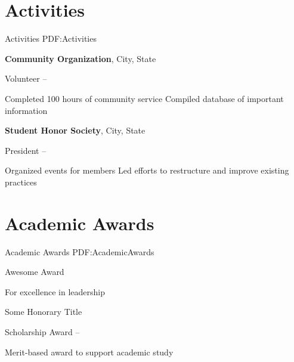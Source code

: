 \documentclass[letterpaper,9pt,oneside]{article}
\begin{document}
\begin{body}


\section
{Activities}
{Activities}
{PDF:Activities}

\textbf{Community Organization}, City, State
\par
Volunteer
\hfill
{} --
\begin{detail}
\SmallEntryGap
\BulletItem
Completed 100 hours of community service
\BulletItem
Compiled database of important information
\end{detail}

\EntryGap
\textbf{Student Honor Society}, City, State
\par
President
\hfill
{} --
\begin{detail}
\SmallEntryGap
\BulletItem
Organized events for members
\BulletItem
Led efforts to restructure and improve existing practices
\end{detail}



\section
{Academic Awards}
{Academic Awards}
{PDF:AcademicAwards}

Awesome Award
\hfill
{}
\begin{detail}
For excellence in leadership
\end{detail}

\EntryGap
Some Honorary Title
\hfill
{}

\EntryGap
Scholarship Award
\hfill 
{} --
\begin{detail}
Merit-based award to support academic study 
\end{detail}

\EntryGap




\end{body}
\end{document}
